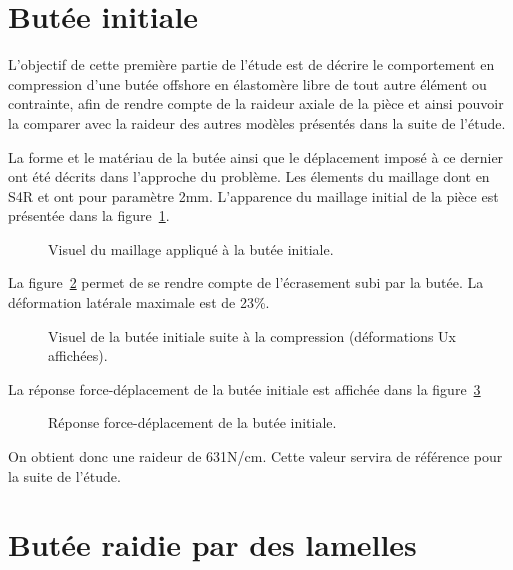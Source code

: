﻿\documentclass{article}
\begin{document}
\section{Butée initiale}

L'objectif de cette première partie de l'étude est de décrire le comportement en compression d'une butée offshore en élastomère libre de tout autre élément ou contrainte, afin de rendre compte de la raideur axiale de la pièce et ainsi pouvoir la comparer avec la raideur des autres modèles présentés dans la suite de l'étude.

La forme et le matériau de la butée ainsi que le déplacement imposé à ce dernier ont été décrits dans l'approche du problème. Les élements du maillage dont en S4R et ont pour paramètre 2mm. L'apparence du maillage initial de la pièce est présentée dans la figure~\ref{fig3}.

\begin{figure}[!h]
	\centering
	\caption{Visuel du maillage appliqué à la butée initiale.}
	\label{fig3}
\end{figure}

La figure~\ref{fig4} permet de se rendre compte de l'écrasement subi par la butée. La déformation latérale maximale est de 23\%.

\begin{figure}[!h]
	\centering
	\caption{Visuel de la butée initiale suite à la compression (déformations Ux affichées).}
	\label{fig4}
\end{figure}

La réponse force-déplacement de la butée initiale est affichée dans la figure~\ref{fig5}

\begin{figure}[!h]
	\centering
	\caption{Réponse force-déplacement de la butée initiale.}
	\label{fig5}
\end{figure}

On obtient donc une raideur de 631N/cm. Cette valeur servira de référence pour la suite de l'étude.


\section{Butée raidie par des lamelles}
\end{document}
